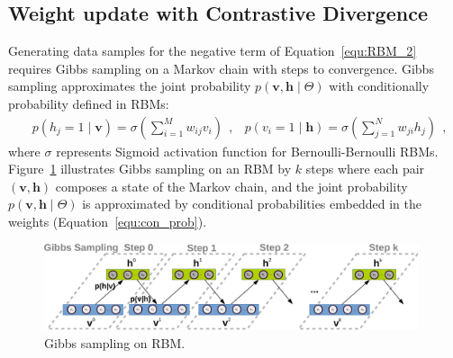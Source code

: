 \subsection{Weight update with Contrastive Divergence}
\label{sec:cd}
Generating data samples for the negative term of Equation~\ref{equ:RBM_2} requires Gibbs sampling on a Markov chain with \DIFdelbegin {}\DIFdelend \DIFaddbegin {}\DIFaddend steps to convergence.
Gibbs sampling approximates the joint probability $p( \mathbf{v}, \mathbf{h} \mid  \Theta)$ with \DIFaddbegin {}\DIFaddend conditionally probability defined in RBMs:
\begin{equation}
\begin{aligned}
& p(h_j = 1 \mid \mathbf{v}) = \sigma(\sum_{i=1}^{M} w_{ij} v_i)~~,
& p(v_i = 1 \mid \mathbf{h}) = \sigma(\sum_{j=1}^{N} w_{ji} h_j)~~,
\end{aligned}
\label{equ:con_prob}
\end{equation} 
where $\sigma$ represents \DIFaddbegin {}\DIFaddend Sigmoid activation function for Bernoulli-Bernoulli RBMs.
Figure~\ref{fig:gibbs} illustrates \DIFdelbegin {}\DIFdelend Gibbs sampling on an RBM by $k$ steps where each pair \DIFdelbegin {}\DIFdelend $(\mathbf{v}, \mathbf{h})$ composes a state of the Markov chain, and the joint probability $p( \mathbf{v}, \mathbf{h} \mid  \Theta)$ is approximated by conditional probabilities embedded in the weights (Equation~\ref{equ:con_prob}).

\begin{figure}[hbt]
	\centering
	\includegraphics[width=0.98\textwidth]{pics_sdlm/gibbs_sampling.pdf}
	\caption{Gibbs sampling on \DIFdelbeginFL {}\DIFdelendFL \DIFaddbeginFL {}\DIFaddendFL RBM.}
	\label{fig:gibbs}
\end{figure}

